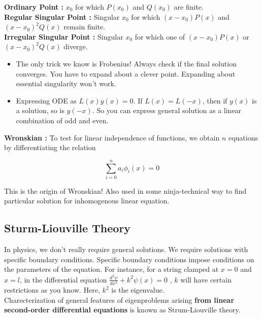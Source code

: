 \documentclass{report}
\begin{document}
\noindent \textbf{Ordinary Point :} $x_0$ for which $P(x_0)$ and $Q(x_0)$ are finite.\\

\noindent \textbf{Regular Singular Point :} Singular $x_0$ for which $(x-x_0)P(x)$ and $(x-x_0)^2 Q(x)$ remain finite.\\

\noindent \textbf{Irregular Singular Point :} Singular $x_0$ for which one of $(x-x_0)P(x)$ or $(x-x_0)^2 Q(x)$ diverge.\\

\begin{itemize}
  \item The only trick we know is Frobenius! Always check if the final solution converges. You have to expand about a clever point. Expanding about essential singularity won't work.\\

  \item Expressing ODE as $L(x)y(x) = 0$. If $L(x) = L(-x)$, then if $y(x)$ is a solution, so is $y(-x)$. So you can express general solution as a linear combination of odd and even.
\end{itemize}

\noindent \textbf{Wronskian :} To test for linear independence of functions, we obtain $n$ equations by differentiating the relation 

$$\sum_{i=0}^{n}a_i \phi_i (x) = 0$$

\noindent This is the origin of Wronskian! Also used in some ninja-technical way to find particular solution for inhomogenous linear equation.

\subsection{Sturm-Liouville Theory}

In physics, we don't really require general solutions. We require solutions with specific boundary conditions. Specific boundary conditions impose conditions on the parameters of the equation. For instance, for a string clamped at $x=0$ and $x=l$, in the differential equation $\frac{d^2\psi}{dx^2} + k^2\psi(x) = 0$ , $k$ will have certain restrictions as you know. Here, $k^2$ is the eigenvalue.\\

\noindent Charecterization of general features of eigenproblems arising \textbf{from linear second-order differential equations} is known as Strum-Liouville theory.\\
\end{document}

